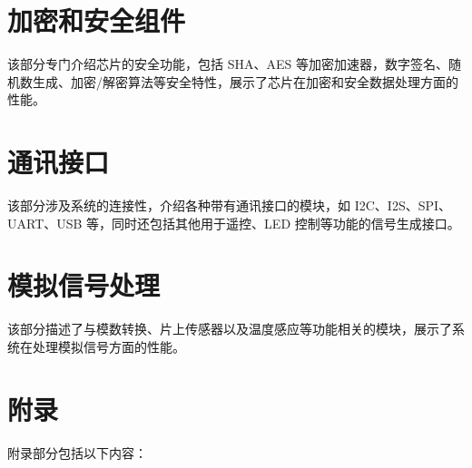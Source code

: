 \documentclass[openany, 10pt]{book}
\begin{document}
\part{加密和安全组件}

该部分专门介绍芯片的安全功能，包括 SHA、AES 等加密加速器，数字签名、随机数生成、加密/解密算法等安全特性，展示了芯片在加密和安全数据处理方面的性能。





\part{通讯接口}


该部分涉及系统的连接性，介绍各种带有通讯接口的模块，如 I2C、I2S、SPI、UART、USB 等，同时还包括其他用于遥控、LED 控制等功能的信号生成接口。


\part{模拟信号处理}


该部分描述了与模数转换、片上传感器以及温度感应等功能相关的模块，展示了系统在处理模拟信号方面的性能。




\part{附录}\label{appendix}

附录部分包括以下内容：
\end{document}
